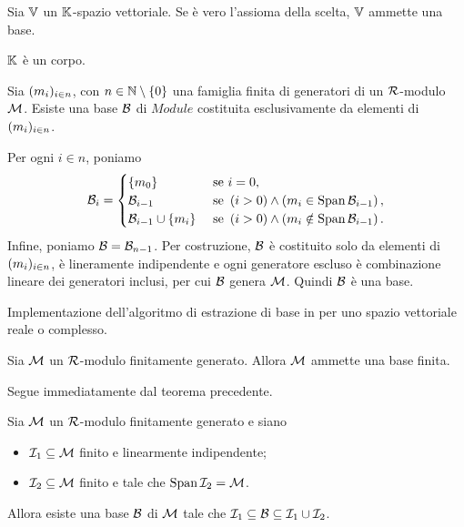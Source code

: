 \begin{Corollary}
	Sia $\mathbb{V}$ un $\mathbb{K}$-spazio vettoriale. Se \`e vero
	l'assioma della scelta, $\mathbb{V}$ ammette una base.
\end{Corollary}
\Proof $\mathbb{K}$ \`e un corpo. \EndProof
\begin{Lemma}
	Sia $(m_i)_{i \in n}$, con $n \in
	\mathbb{N} \setminus \lbrace 0 \rbrace$ una famiglia finita di generatori di un
	$\mathcal{R}$-modulo $\mathcal{M}$. Esiste una base $\mathcal{B}$ di
	$Module$ costituita esclusivamente da elementi di
	$(m_i)_{i \in n}$.
\end{Lemma}
\Proof Per ogni $i \in n$, poniamo
\[
  \mathcal{B}_i =
  \begin{cases}
	  \lbrace m_0 \rbrace&\text{ se }i = 0,\\
  	\mathcal{B}_{i - 1}&\text{ se }\left ( i > 0 \right ) \wedge \left ( m_i \in
	  	\operatorname{Span}{\mathcal{B}_{i - 1}} \right ),\\
  	\mathcal{B}_{i - 1} \cup \lbrace m_i \rbrace
	  	&\text{ se }\left ( i > 0 \right ) \wedge \left ( m_i \notin
  		\operatorname{Span}{\mathcal{B}_{i - 1}} \right ).
  \end{cases}
\]
Infine, poniamo $\mathcal{B} = \mathcal{B}_{n - 1}$. Per costruzione,
$\mathcal{B}$ \`e costituito solo da elementi di
$(m_i)_{i \in n}$, \`e lineramente indipendente e ogni
generatore escluso \`e combinazione lineare dei generatori inclusi, per
cui $\mathcal{B}$ genera $\mathcal{M}$. Quindi $\mathcal{B}$ \`e una base.
\EndProof
\begin{listing}
	\caption{Implementazione dell'algoritmo di estrazione di base in 
    per uno spazio vettoriale reale o complesso.}
\end{listing}
\begin{Corollary}
	Sia $\mathcal{M}$ un $\mathcal{R}$-modulo finitamente generato. Allora
	$\mathcal{M}$ ammette una base finita.
\end{Corollary}
\Proof Segue immediatamente dal teorema precedente.
\begin{Lemma}
	Sia $\mathcal{M}$ un $\mathcal{R}$-modulo finitamente generato e siano
	\begin{itemize}
		\item $\mathcal{I}_1 \subseteq \mathcal{M}$ finito e linearmente
		indipendente;
		\item $\mathcal{I}_2 \subseteq \mathcal{M}$ finito e tale che
		$\operatorname{Span}{\mathcal{I}_2} = \mathcal{M}$.
	\end{itemize}
	Allora esiste una base $\mathcal{B}$ di $\mathcal{M}$ tale che
	$\mathcal{I}_1 \subseteq \mathcal{B} \subseteq \mathcal{I}_1 \cup \mathcal{I}_2$.
\end{Lemma}
